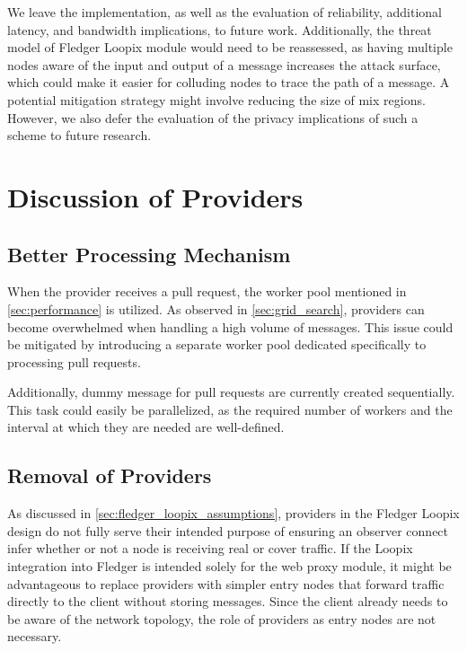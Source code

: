 \documentclass[a4paper,11pt,oneside]{report}
\begin{document}
We leave the implementation, as well as the evaluation of reliability, additional latency, and bandwidth implications, to future work. Additionally, the threat model of Fledger Loopix module would need to be reassessed, as having multiple nodes aware of the input and output of a message increases the attack surface, which could make it easier for colluding nodes to trace the path of a message. A potential mitigation strategy might involve reducing the size of mix regions. However, we also defer the evaluation of the privacy implications of such a scheme to future research.

\section{Discussion of Providers}

\subsection{Better Processing Mechanism}

When the provider receives a pull request, the worker pool mentioned in \autoref{sec:performance} is utilized. As observed in \autoref{sec:grid_search}, providers can become overwhelmed when handling a high volume of messages. This issue could be mitigated by introducing a separate worker pool dedicated specifically to processing pull requests.

Additionally, dummy message for pull requests are currently created sequentially. This task could easily be parallelized, as the required number of workers and the interval at which they are needed are well-defined.

\subsection{Removal of Providers}

As discussed in \autoref{sec:fledger_loopix_assumptions}, providers in the Fledger Loopix design do not fully serve their intended purpose of ensuring an observer connect infer whether or not a node is receiving real or cover traffic. If the Loopix integration into Fledger is intended solely for the web proxy module, it might be advantageous to replace providers with simpler entry nodes that forward traffic directly to the client without storing messages. Since the client already needs to be aware of the network topology, the role of providers as entry nodes are not necessary.
\end{document}
